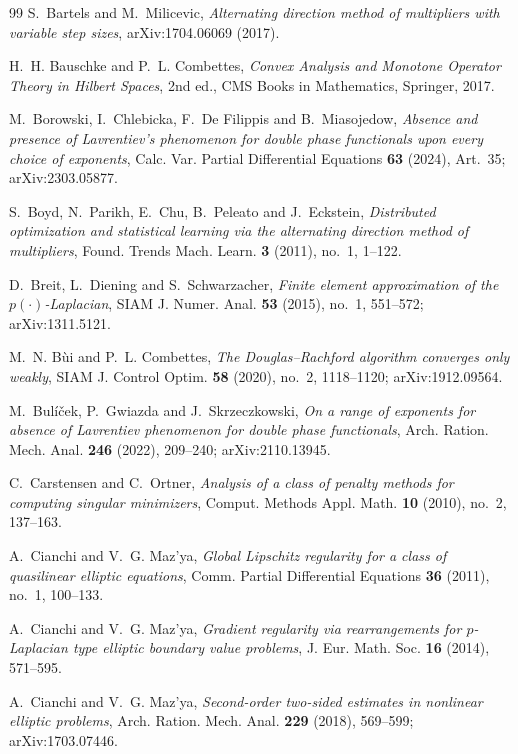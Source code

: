 \documentclass[11pt]{amsart}
\theoremstyle{definition}
\theoremstyle{remark}
\numberwithin{equation}{section}
\begin{document}
\begin{thebibliography}{99}
S.~Bartels and M.~Milicevic, \emph{Alternating direction method of multipliers with variable step sizes}, arXiv:1704.06069 (2017).

H.~H. Bauschke and P.~L. Combettes, \emph{Convex Analysis and Monotone Operator Theory in Hilbert Spaces}, 2nd ed., CMS Books in Mathematics, Springer, 2017.

M.~Borowski, I.~Chlebicka, F.~De Filippis and B.~Miasojedow, \emph{Absence and presence of Lavrentiev's phenomenon for double phase functionals upon every choice of exponents}, Calc. Var. Partial Differential Equations \textbf{63} (2024), Art.~35; arXiv:2303.05877.

S.~Boyd, N.~Parikh, E.~Chu, B.~Peleato and J.~Eckstein, \emph{Distributed optimization and statistical learning via the alternating direction method of multipliers}, Found. Trends Mach. Learn. \textbf{3} (2011), no.~1, 1--122.

D.~Breit, L.~Diening and S.~Schwarzacher, \emph{Finite element approximation of the $p(\cdot)$-Laplacian}, SIAM J. Numer. Anal. \textbf{53} (2015), no.~1, 551--572; arXiv:1311.5121.

M.~N. B\`ui and P.~L. Combettes, \emph{The Douglas--Rachford algorithm converges only weakly}, SIAM J. Control Optim. \textbf{58} (2020), no.~2, 1118--1120; arXiv:1912.09564.

M.~Bul\'i\v{c}ek, P.~Gwiazda and J.~Skrzeczkowski, \emph{On a range of exponents for absence of Lavrentiev phenomenon for double phase functionals}, Arch. Ration. Mech. Anal. \textbf{246} (2022), 209--240; arXiv:2110.13945.

C.~Carstensen and C.~Ortner, \emph{Analysis of a class of penalty methods for computing singular minimizers}, Comput. Methods Appl. Math. \textbf{10} (2010), no.~2, 137--163.

A.~Cianchi and V.~G. Maz'ya, \emph{Global Lipschitz regularity for a class of quasilinear elliptic equations}, Comm. Partial Differential Equations \textbf{36} (2011), no.~1, 100--133.

A.~Cianchi and V.~G. Maz'ya, \emph{Gradient regularity via rearrangements for $p$-Laplacian type elliptic boundary value problems}, J. Eur. Math. Soc. \textbf{16} (2014), 571--595.

A.~Cianchi and V.~G. Maz'ya, \emph{Second-order two-sided estimates in nonlinear elliptic problems}, Arch. Ration. Mech. Anal. \textbf{229} (2018), 569--599; arXiv:1703.07446.


\end{thebibliography}
\end{document}
